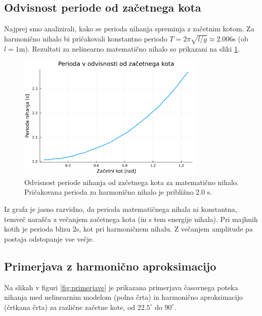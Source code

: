 \documentclass{article}
\begin{document}
\subsection{Odvisnost periode od začetnega kota}
Najprej smo analizirali, kako se perioda nihanja spreminja z začetnim kotom. Za harmonično 
nihalo bi pričakovali konstantno periodo $T = 2\pi\sqrt{l/g} \approx 2.006$s (ob $l = 1$m). 
Rezultati za nelinearno matematično nihalo so prikazani na sliki \ref{fig:perioda}.

\begin{figure}[h!]
    \centering
    \includegraphics[width=0.8\textwidth]{../slike/perioda_vs_kot.png}
    \caption{Odvisnost periode nihanja od začetnega kota za matematično nihalo. Pričakovana perioda 
    za harmonično nihalo je približno 2.0 s.}
    \label{fig:perioda}
\end{figure}

Iz grafa je jasno razvidno, da perioda matematičnega nihala ni konstantna, temveč narašča z večanjem 
začetnega kota (in s tem energije nihala). Pri majhnih kotih je perioda blizu 2s, kot pri harmoničnem nihalu. 
Z večanjem amplitude pa postaja odstopanje vse večje.

\subsection{Primerjava z harmonično aproksimacijo}
Na slikah v figuri \ref{fig:primerjave} je prikazana primerjava časovnega poteka nihanja med nelinearnim 
modelom (polna črta) in harmonično aproksimacijo (črtkana črta) za različne začetne kote, od $22.5^\circ$ do $90^\circ$.
\end{document}
